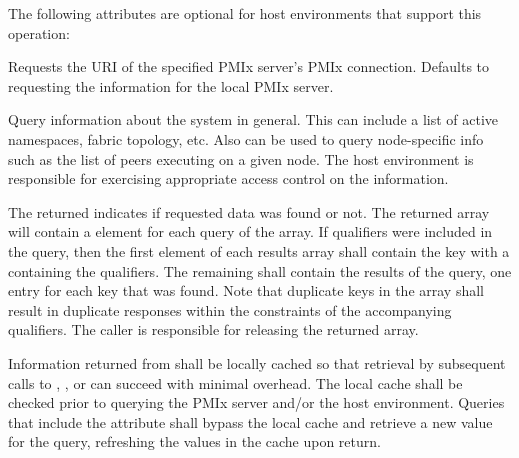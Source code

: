 \reqattrend


\optattrstart
The following attributes are optional for host environments that support this operation:

 Requests the URI of the specified \ac{PMIx} server's \ac{PMIx} connection. Defaults to requesting the information for the local \ac{PMIx} server.
\pasteAttributeItemEnd
{}

\optattrend

\descr

Query information about the system in general.
This can include a list of active namespaces, fabric topology, etc.
Also can be used to query node-specific info such as the list of peers executing on a given node. The host environment is responsible for exercising appropriate access control on the information.

The returned  indicates if requested data was found or not. The returned  array will contain a  element for each query of the  array. If qualifiers were included in the query, then the first element of each results array shall contain the  key with a  containing the qualifiers. The remaining  shall contain the results of the query, one entry for each key that was found. Note that duplicate keys in the  array shall result in duplicate responses within the constraints of the accompanying qualifiers. The caller is responsible for releasing the returned array.

\adviceimplstart
Information returned from  shall be locally cached so that retrieval by subsequent calls to , , or  can succeed with minimal overhead. The local cache shall be checked prior to querying the \ac{PMIx} server and/or the host environment. Queries that include the  attribute shall bypass the local cache and retrieve a new value for the query, refreshing the values in the cache upon return.
\adviceimplend


